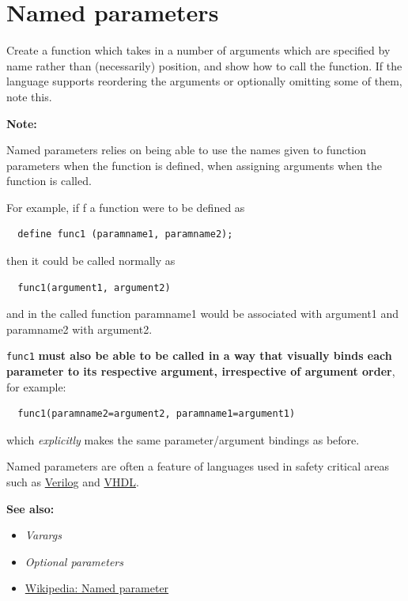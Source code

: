\pagebreak{}
\section*{Named parameters}

Create a function which takes in a number of arguments which are
specified by name rather than (necessarily) position, and show how to
call the function. If the language supports reordering the arguments or
optionally omitting some of them, note this.

\textbf{Note:}

Named parameters relies on being able to use the names given to function
parameters when the function is defined, when assigning arguments when
the function is called.

For example, if f a function were to be defined as 

\begin{verbatim}
  define func1 (paramname1, paramname2); 
\end{verbatim}

then it could be called normally as

\begin{verbatim}
  func1(argument1, argument2)
\end{verbatim}

and in the called function paramname1 would be associated with
argument1 and paramname2 with argument2.

\texttt{func1} \textbf{must also be able to be called in a way that
visually binds each parameter to its respective argument, irrespective
of argument order}, for example:

\begin{verbatim}
  func1(paramname2=argument2, paramname1=argument1)
\end{verbatim}

which \emph{explicitly} makes the same parameter/argument bindings as
before.

Named parameters are often a feature of languages used in safety
critical areas such as
\href{http://en.wikipedia.org/wiki/Verilog}{Verilog} and
\href{http://en.wikipedia.org/wiki/VHDL}{VHDL}.

\textbf{See also:}

\begin{itemize}
\item
  \emph{Varargs}
\item
  \emph{Optional parameters}
\item
  \href{http://en.wikipedia.org/wiki/Named\_parameter}{Wikipedia: Named
  parameter}
\end{itemize}


